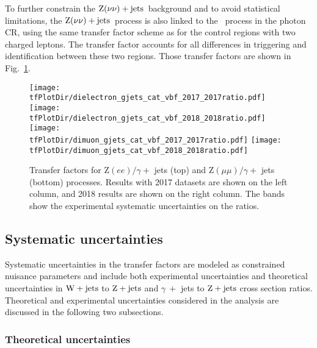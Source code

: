 To further constrain the $\textrm{Z}(\nu\nu)+\textrm{jets}$~background and to avoid statistical limitations, the $\textrm{Z}(\nu\nu)+\textrm{jets}$~process is also linked to the \phojets~process in the photon CR, 
using the same transfer factor scheme as for the control regions with two charged leptons. The transfer factor accounts for all differences in 
triggering and identification between these two regions. Those transfer factors are shown in Fig.~\ref{fig:transfer_factors_gamma}.

\begin{figure}[htbp]
    \centering
          \texttt{[image: \\tfPlotDir/dielectron\_gjets\_cat\_vbf\_2017\_2017ratio.pdf]}
          \texttt{[image: \\tfPlotDir/dielectron\_gjets\_cat\_vbf\_2018\_2018ratio.pdf]} \\
          \texttt{[image: \\tfPlotDir/dimuon\_gjets\_cat\_vbf\_2017\_2017ratio.pdf]}
          \texttt{[image: \\tfPlotDir/dimuon\_gjets\_cat\_vbf\_2018\_2018ratio.pdf]}
    \caption{Transfer factors for $\mathrm{Z}(ee) / \gamma +$ jets (top) and $\mathrm{Z}(\mu\mu) / \gamma +$ jets (bottom) processes. 
    Results with 2017 datasets are shown on the left column, and 2018 results are shown on the right column.
    The bands show the experimental systematic uncertainties on the ratios.}
    \label{fig:transfer_factors_gamma}
\end{figure}

\clearpage

\subsection{Systematic uncertainties}
\label{subsec:sys_uncertainties}

Systematic uncertainties in the transfer factors are modeled as constrained nuisance parameters and include both
experimental uncertainties and theoretical uncertainties in $\mathrm{W}+\textrm{jets}$ to $\mathrm{Z}+\textrm{jets}$ and $\gamma \ +$ jets 
to $\mathrm{Z}+\textrm{jets}$ cross section ratios. Theoretical and experimental uncertainties considered in the analysis are discussed
in the following two subsections.

\subsubsection{Theoretical uncertainties}

